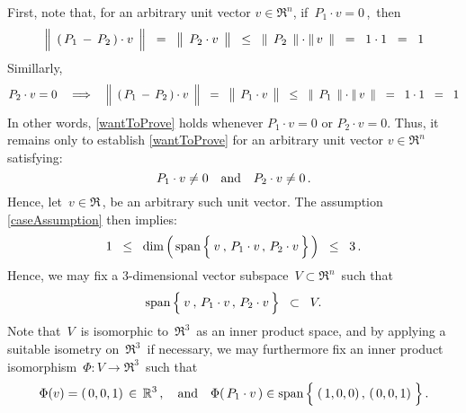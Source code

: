 First, note that, for an arbitrary unit vector $v \in \Re^{n}$,
if \,$P_{1} \cdot v = 0$\,,\, then
\begin{equation*}
\left\Vert\;\, (\,P_{1} \,\overset{{\color{white}.}}{-}\, P_{2}\,)\cdot v \,\;\right\Vert
\;\; = \;\;
	\left\Vert\;\, P_{2} \overset{{\color{white}.}}{\cdot} v \,\;\right\Vert
\;\; \leq \;\;
	\left\Vert\;\, P_{2} \,\;\right\Vert
	\cdot
	\left\Vert\, v \,\;\right\Vert
\;\; = \;\;
	1 \cdot 1
\;\; = \;\;
	1
\end{equation*}
Simillarly,
\begin{equation*}
P_{2} \cdot v = 0
\quad\Longrightarrow\quad
\left\Vert\;\, (\,P_{1} \,\overset{{\color{white}.}}{-}\, P_{2}\,)\cdot v \,\;\right\Vert
\;\; = \;\;
	\left\Vert\;\, P_{1} \overset{{\color{white}.}}{\cdot} v \,\;\right\Vert
\;\; \leq \;\;
	\left\Vert\;\, P_{1} \,\;\right\Vert
	\cdot
	\left\Vert\, v \,\;\right\Vert
\;\; = \;\;
	1 \cdot 1
\;\; = \;\;
	1
\end{equation*}
In other words, \eqref{wantToProve} holds whenever $P_{1}\cdot v = 0$ or $P_{2}\cdot v = 0$.
Thus, it remains only to establish \eqref{wantToProve} for an arbitrary unit vector $v \in \Re^{n}$ satisfying:
\begin{equation}\label{caseAssumption}
P_{1} \cdot v \neq 0
\quad\textnormal{and}\quad
P_{2} \cdot v \neq 0\,.
\end{equation}
Hence, let \,$v \in \Re$\,, be an arbitrary such unit vector.
The assumption \eqref{caseAssumption} then implies:
\begin{equation*}
1
\;\; \leq \;\;
	\dim\left(\,\span\left\{\,\overset{{\color{white}-}}{v} \,,\, P_{1}\cdot v \,,\, P_{2}\cdot v\,\right\}\,\right)
\;\; \leq \;\;
	3\,.
\end{equation*}
Hence, we may fix a $3$-dimensional vector subspace \,$V \subset \Re^{n}$\, such that
\begin{equation*}
\span\left\{\,\overset{{\color{white}-}}{v} \,,\, P_{1}\cdot v \,,\, P_{2}\cdot v\,\right\}
\;\; \subset \;\;
	V.
\end{equation*}
Note that \,$V$\, is isomorphic to \,$\Re^{3}$\, as an inner product space,
and by applying a suitable isometry on \,$\Re^{3}$\, if necessary,
we may furthermore fix an inner product isomorphism \,$\Phi : V \longrightarrow \Re^{3}$\,
such that
\begin{equation*}
\Phi(v) = (\,0,0,1) \,\in\, \Re^{3}\,,
\quad\textnormal{and}\quad
\Phi(\,P_{1}\cdot v\,) \in \span\left\{\;(\,\overset{{\color{white}.}}{1},0,0) \,,\, (\,0,0,1)\;\right\}.
\end{equation*}
